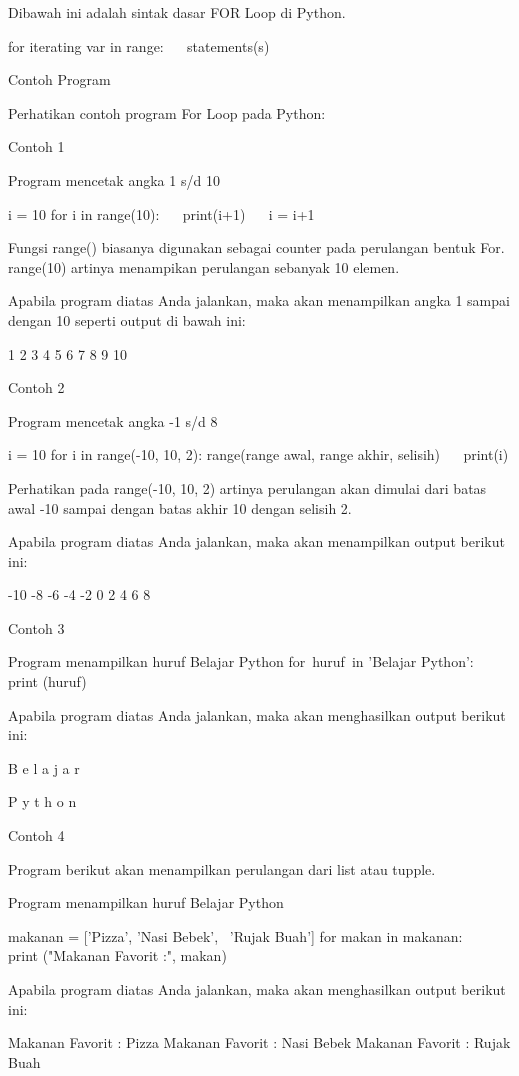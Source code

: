 Dibawah ini adalah sintak dasar FOR Loop di Python.

 
for iterating     var in range: 
~~ statements(s) 

Contoh Program

Perhatikan contoh program For Loop pada Python:

Contoh 1

 
Program mencetak angka 1 s/d 10 

i = 10 
for i in range(10): 
~~ print(i+1) 
~~ i = i+1 

Fungsi   range()   biasanya digunakan sebagai counter pada perulangan bentuk For. range(10) artinya menampikan perulangan sebanyak 10 elemen.

Apabila program diatas Anda jalankan, maka akan menampilkan angka 1 sampai dengan 10 seperti output di bawah ini:

 
1 
2 
3 
4 
5 
6 
7 
8 
9 
10 

Contoh 2

 
 Program mencetak angka -1 s/d 8 

i = 10 
for i in range(-10, 10, 2):       range(range awal, range akhir, selisih) 
~~ print(i) 


Perhatikan pada range(-10, 10, 2) artinya perulangan akan dimulai dari batas awal -10 sampai dengan batas akhir 10 dengan selisih 2.

Apabila program diatas Anda jalankan, maka akan menampilkan output berikut ini:

 
-10 
-8 
-6 
-4 
-2 
0 
2 
4 
6 
8 

Contoh 3

 
Program menampilkan huruf Belajar Python 
for~huruf~in 'Belajar Python':    
~~ print (huruf) 

Apabila program diatas Anda jalankan, maka akan menghasilkan output berikut ini:

 
B 
e 
l 
a 
j 
a 
r 
  
P 
y 
t 
h 
o 
n 

Contoh 4

Program berikut akan menampilkan perulangan dari list atau tupple.

 
Program menampilkan huruf Belajar Python 

makanan = ['Pizza', 'Nasi Bebek',~ 'Rujak Buah'] 
for makan in makanan: 
~~ print ("Makanan Favorit :", makan) 

Apabila program diatas Anda jalankan, maka akan menghasilkan output berikut ini:

 
Makanan Favorit : Pizza 
Makanan Favorit : Nasi Bebek 
Makanan Favorit : Rujak Buah 



